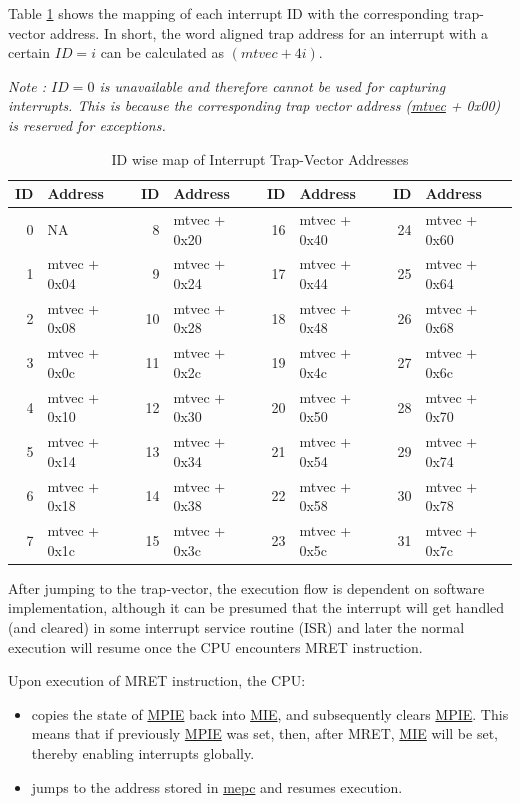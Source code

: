 \documentclass[main\_\_EN.tex]{subfiles}
\begin{document}
Table \ref{tab:riscvcpu-int-isr-addr-map} shows the mapping of each interrupt ID with the corresponding trap-vector address. In short, the word aligned trap address for an interrupt with a certain $ID=i$ can be calculated as $(\hyperref[fielddesc:MTVECBASE]{mtvec} + 4i)$.

 \textit{Note : $ID=0$ is unavailable and therefore cannot be used for capturing interrupts. This is because the corresponding trap vector address (\hyperref[fielddesc:MTVECBASE]{mtvec} + 0x00) is reserved for exceptions.}

\begin{longtable}{ | r | l || r | l || r | l || r | l | }
\caption{ID wise map of Interrupt Trap-Vector Addresses} \label{tab:riscvcpu-int-isr-addr-map}
\\ \hline
\rowcolor{lightgray}
ID & Address & ID & Address & ID & Address & ID & Address \\ \hline
 0 & NA           &  8 & mtvec + 0x20 & 16 & mtvec + 0x40 & 24 & mtvec + 0x60   \\ \hline
 1 & mtvec + 0x04 &  9 & mtvec + 0x24 & 17 & mtvec + 0x44 & 25 & mtvec + 0x64   \\ \hline
 2 & mtvec + 0x08 & 10 & mtvec + 0x28 & 18 & mtvec + 0x48 & 26 & mtvec + 0x68   \\ \hline
 3 & mtvec + 0x0c & 11 & mtvec + 0x2c & 19 & mtvec + 0x4c & 27 & mtvec + 0x6c   \\ \hline
 4 & mtvec + 0x10 & 12 & mtvec + 0x30 & 20 & mtvec + 0x50 & 28 & mtvec + 0x70   \\ \hline
 5 & mtvec + 0x14 & 13 & mtvec + 0x34 & 21 & mtvec + 0x54 & 29 & mtvec + 0x74   \\ \hline
 6 & mtvec + 0x18 & 14 & mtvec + 0x38 & 22 & mtvec + 0x58 & 30 & mtvec + 0x78   \\ \hline
 7 & mtvec + 0x1c & 15 & mtvec + 0x3c & 23 & mtvec + 0x5c & 31 & mtvec + 0x7c   \\ \hline
\end{longtable}

After jumping to the trap-vector, the execution flow is dependent on software implementation, although it can be presumed that the interrupt will get handled (and cleared) in some interrupt service routine (ISR) and later the normal execution will resume once the CPU encounters MRET instruction.

Upon execution of MRET instruction, the CPU:
\begin{itemize}
    \item copies the state of \hyperref[fielddesc:MSTATUSMPIE]{MPIE} back into \hyperref[fielddesc:MSTATUSMIE]{MIE}, and subsequently clears \hyperref[fielddesc:MSTATUSMPIE]{MPIE}. This means that if previously \hyperref[fielddesc:MSTATUSMPIE]{MPIE} was set, then, after MRET, \hyperref[fielddesc:MSTATUSMIE]{MIE} will be set, thereby enabling interrupts globally.
    \item jumps to the address stored in \hyperref[regdesc:MEPC]{mepc} and resumes execution.
\end{itemize}
\end{document}
